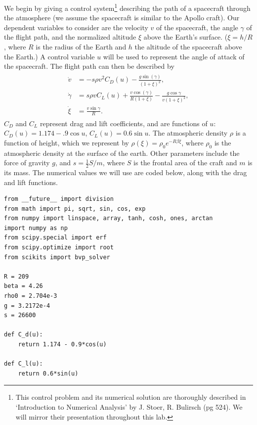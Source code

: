 We begin by giving a control system\footnote{This control problem and its numerical solution are thoroughly described in `Introduction to Numerical Analysis' by J. Stoer, R. Bulirsch (pg 524). 
We will mirror their presentation throughout this lab.}
describing the path of a spacecraft through the atmosphere 
(we assume the spacecraft is similar to the Apollo craft).
Our dependent variables to consider are the velocity $v$ of the spacecraft,  
the angle $\gamma$ of the flight path, 
and the normalized altitude $\xi$ above the Earth's surface. 
($\xi = h/R$, where $R$ is the radius of the Earth and $h$ the altitude of the spacecraft above the Earth.) 
A control variable  $u$ will be used to represent the angle of attack of the spacecraft. 
The flight path can then be described by 
\begin{align}
\begin{split}
\dot{v} &= -s\rho v^2C_D(u) - \frac{g\sin(\gamma)}{(1+\xi)^2},\\
\dot{\gamma} &= s \rho v C_L(u) + \frac{v \cos(\gamma)}{R(1+\xi)} - \frac{g \cos \gamma}{v(1+\xi)^2},\\
\dot{\xi} &= \frac{v \sin \gamma}{R}.
\end{split} \label{eqn:reentry:control_system}
\end{align}
$C_D$ and $C_L$ represent drag and lift coefficients, and are functions of $u$: $C_D(u) = 1.174 - .9\cos u$, $C_L(u) = 0.6\sin u$. 
The atmospheric density $\rho$ is a function of height, which we represent by $\rho(\xi) = \rho_0e^{-R\beta\xi}$, where  $\rho_0$ is the atmospheric density at the surface of the earth. 
Other parameters include the force of gravity $g$, and $s = \frac{1}{2}S/m$, where $S$ is the frontal area of the craft and $m$ is its mass.
The numerical values we will use are coded below, along with the drag and lift functions. 
\begin{lstlisting}
from __future__ import division
from math import pi, sqrt, sin, cos, exp
from numpy import linspace, array, tanh, cosh, ones, arctan
import numpy as np
from scipy.special import erf
from scipy.optimize import root
from scikits import bvp_solver

R = 209
beta = 4.26
rho0 = 2.704e-3
g = 3.2172e-4
s = 26600

def C_d(u):
	return 1.174 - 0.9*cos(u)

def C_l(u):
	return 0.6*sin(u)
\end{lstlisting}

